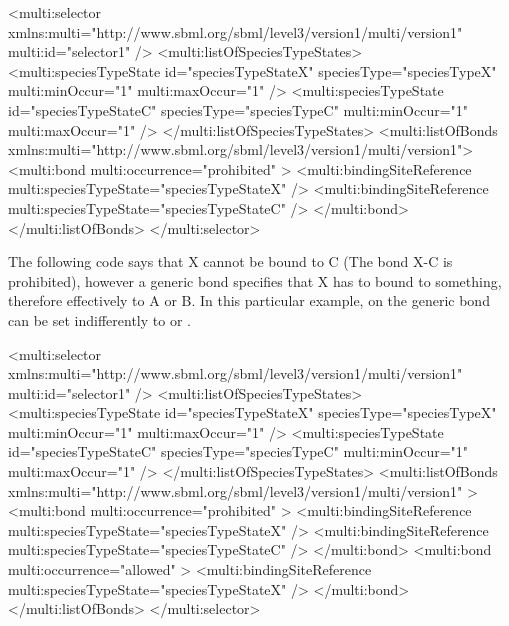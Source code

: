 \begin{example}
<multi:selector xmlns:multi="http://www.sbml.org/sbml/level3/version1/multi/version1" 
                multi:id="selector1" />
  <multi:listOfSpeciesTypeStates>
    <multi:speciesTypeState id="speciesTypeStateX" speciesType="speciesTypeX"                                           
                            multi:minOccur="1" multi:maxOccur="1" />
    <multi:speciesTypeState id="speciesTypeStateC" speciesType="speciesTypeC"                           
                            multi:minOccur="1" multi:maxOccur="1" />
  </multi:listOfSpeciesTypeStates>
  <multi:listOfBonds xmlns:multi="http://www.sbml.org/sbml/level3/version1/multi/version1">
    <multi:bond multi:occurrence="prohibited" >
      <multi:bindingSiteReference multi:speciesTypeState="speciesTypeStateX" />
      <multi:bindingSiteReference multi:speciesTypeState="speciesTypeStateC" />
    </multi:bond>
  </multi:listOfBonds>
</multi:selector> 
\end{example}
 
The following code says that X cannot be bound to C (The bond X-C is prohibited), however a generic bond specifies that X has to bound to something, therefore effectively to A or B. In this particular example,  on the generic bond can be set indifferently to  or .

\begin{example}
<multi:selector xmlns:multi="http://www.sbml.org/sbml/level3/version1/multi/version1" 
                multi:id="selector1" />
  <multi:listOfSpeciesTypeStates>
    <multi:speciesTypeState id="speciesTypeStateX" speciesType="speciesTypeX"                                           
                            multi:minOccur="1" multi:maxOccur="1" />
    <multi:speciesTypeState id="speciesTypeStateC" speciesType="speciesTypeC"                           
                            multi:minOccur="1" multi:maxOccur="1" />
  </multi:listOfSpeciesTypeStates>
  <multi:listOfBonds xmlns:multi="http://www.sbml.org/sbml/level3/version1/multi/version1" >
    <multi:bond multi:occurrence="prohibited" >
      <multi:bindingSiteReference multi:speciesTypeState="speciesTypeStateX" />
      <multi:bindingSiteReference multi:speciesTypeState="speciesTypeStateC" />
    </multi:bond>
    <multi:bond multi:occurrence="allowed" >
      <multi:bindingSiteReference multi:speciesTypeState="speciesTypeStateX" />
    </multi:bond>
  </multi:listOfBonds>
</multi:selector> 
\end{example}

